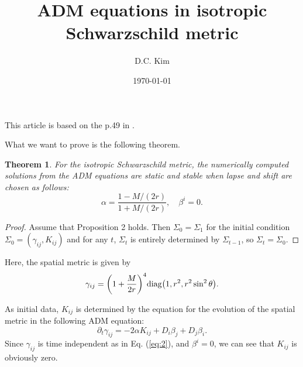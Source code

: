 \documentclass{article}
\title{ADM equations in isotropic Schwarzschild metric}
\date{\today}
\author{D.C. Kim}
\newtheorem{theorem}{Theorem}
\begin{document}
	\maketitle
	This article is based on the p.49 in \cite{baumgarte2010numerical}.
	
	What we want to prove is the following theorem.
	
	\begin{theorem}
		For the isotropic Schwarzschild metric, the numerically computed solutions from the ADM equations are static and stable when lapse and shift are chosen as follows:
		\begin{equation}
			\alpha = \frac{1 - M / (2r)}{1+M/(2r)}, \quad \beta^i = 0.
		\end{equation}
	\end{theorem}

	\begin{proof}
		Assume that Proposition 2 holds. Then $\Sigma_0=\Sigma_1$ for the initial condition $\Sigma_0 = (\gamma_{ij}, K_{ij})$ and for any $t$, $\Sigma_t$ is entirely determined by $\Sigma_{t-1}$, so $\Sigma_t = \Sigma_0$.
	\end{proof}

	Here, the spatial metric is given by
	\begin{equation}
		\gamma_{ij} = \qty(1 + \frac{M}{2r})^4 \mathrm{diag}\qty(1, r^2, r^2\sin^2\theta).\label{eq:2}
	\end{equation}

	As initial data, $K_{ij}$ is determined by the equation for the evolution of the spatial metric in the following ADM equation:
	\begin{equation}
		\partial_t \gamma_{ij} = - 2 \alpha K_{ij} + D_i \beta_j + D_j \beta_i.
	\end{equation}
	Since $\gamma_{ij}$ is time independent as in Eq. (\ref{eq:2}), and $\beta^i = 0$, we can see that $K_{ij}$ is obviously zero.
	
\end{document}
